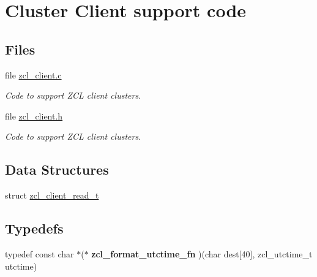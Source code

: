 \hypertarget{group__zcl__client}{\section{Cluster Client support code}
\label{group__zcl__client}
}
\subsection*{Files}
\begin{DoxyCompactItemize}
\item 
file \hyperlink{zcl__client_8c}{zcl\-\_\-client.\-c}
\begin{DoxyCompactList}\small\item\em Code to support Z\-C\-L client clusters. \end{DoxyCompactList}\item 
file \hyperlink{zcl__client_8h}{zcl\-\_\-client.\-h}
\begin{DoxyCompactList}\small\item\em Code to support Z\-C\-L client clusters. \end{DoxyCompactList}\end{DoxyCompactItemize}
\subsection*{Data Structures}
\begin{DoxyCompactItemize}
\item 
struct \hyperlink{structzcl__client__read__t}{zcl\-\_\-client\-\_\-read\-\_\-t}
\end{DoxyCompactItemize}
\subsection*{Typedefs}
\begin{DoxyCompactItemize}
\item 
\hypertarget{group__zcl__client_ga95a82598479d6f25720ce51aa416cccd}{typedef const char $\ast$($\ast$ {\bfseries zcl\-\_\-format\-\_\-utctime\-\_\-fn} )(char dest\mbox{[}40\mbox{]}, zcl\-\_\-utctime\-\_\-t utctime)}\label{group__zcl__client_ga95a82598479d6f25720ce51aa416cccd}

\end{DoxyCompactItemize}
